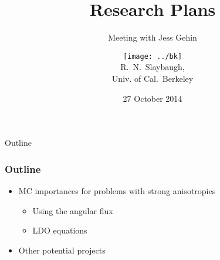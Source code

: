 \documentclass[xcolor=x11names,compress]{beamer}
\renewcommand{\(}{\begin{columns}}
\renewcommand{\)}{\end{columns}}
\newcommand{\<}[1]{\begin{column}{#1}}
\renewcommand{\>}{\end{column}}
\begin{document}
\begin{frame}
\title{Research Plans}
\subtitle{Meeting with Jess Gehin}
\author{
        \texttt{[image: ../bk]}\\R.\ N.\ Slaybaugh, \\ Univ. of Cal.\ Berkeley}

\date{27 October 2014}
\titlepage
\end{frame}

\begin{frame}[fragile]{Outline}
  \frametitle{Outline}
  \begin{itemize}
	\item MC importances for problems with strong anisotropies
	\begin{itemize}
	  \item Using the angular flux
	  \item LDO equations
	\end{itemize}
	\item Other potential projects
  \end{itemize}

\end{frame}


\end{document}
